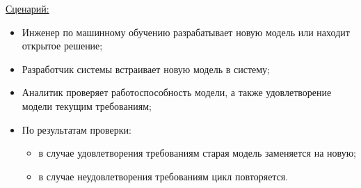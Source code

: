 \underline{Сценарий:}

\begin{itemize}
    \item Инженер по машинному обучению разрабатывает новую модель или находит открытое решение;
    \item Разработчик системы встраивает новую модель в систему;
    \item Аналитик проверяет работоспособность модели, а также удовлетворение модели текущим требованиям;
    \item По результатам проверки:
        \begin{itemize}
            \item в случае удовлетворения требованиям старая модель заменяется на новую;
            \item в случае неудовлетворения требованиям цикл повторяется.
        \end{itemize}
\end{itemize}